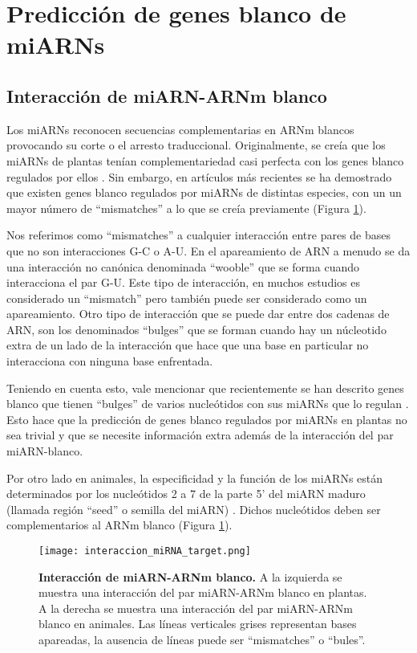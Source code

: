 \section{Predicción de genes blanco de miARNs}

\subsection{Interacción de miARN-ARNm blanco}

Los miARNs reconocen secuencias complementarias en ARNm blancos provocando su corte o el arresto traduccional.
Originalmente, se creía que los miARNs de plantas tenían complementariedad casi perfecta con los genes blanco regulados por ellos \citep{pmid19167326,pmid12869753,pmid12242443}.
Sin embargo, en artículos más recientes se ha demostrado que existen genes blanco regulados por miARNs de distintas especies, con un un mayor número de ``mismatches'' a lo que se creía previamente \citep{German2008} (Figura \ref{fig:interaccion_miRNA_target}).

Nos referimos como ``mismatches'' a cualquier interacción entre pares de bases que no son interacciones G-C o A-U.
En el apareamiento de ARN a menudo se da una interacción no canónica denominada ``wooble'' que se forma cuando interacciona el par G-U.
Este tipo de interacción, en muchos estudios es considerado un ``mismatch'' pero también puede ser considerado como un apareamiento. 
Otro tipo de interacción que se puede dar entre dos cadenas de ARN, son los denominados ``bulges'' que se forman cuando hay un núcleotido extra de un lado de la interacción que hace que una base en particular no interacciona con ninguna base enfrentada.

Teniendo en cuenta esto, vale mencionar que recientemente se han descrito genes blanco que tienen ``bulges'' de varios nucleótidos con sus miARNs que lo regulan \citep{pmid24561804}.
Esto hace que la predicción de genes blanco regulados por miARNs en plantas no sea trivial y que se necesite información extra además de la interacción del par miARN-blanco.

Por otro lado en animales, la especificidad y la función de los miARNs están determinados por los nucleótidos 2 a 7 de la parte 5' del miARN maduro (llamada región ``seed'' o semilla del miARN) \citep{pmid12672692}.
Dichos nucleótidos deben ser complementarios al ARNm blanco (Figura \ref{fig:interaccion_miRNA_target}).

\begin{figure}[htbp!] 
	\centering    
	\texttt{[image: interaccion\_miRNA\_target.png]}
	\caption[Interacción de miARN-ARNm blanco]{
		\textbf{Interacción de miARN-ARNm blanco.}
        A la izquierda se muestra una interacción del par miARN-ARNm blanco en plantas.
        A la derecha se muestra una interacción del par miARN-ARNm blanco en animales.
        Las líneas verticales grises representan bases apareadas, la ausencia de líneas puede ser ``mismatches'' o ``bules''.
	}
	\label{fig:interaccion_miRNA_target}
\end{figure}



